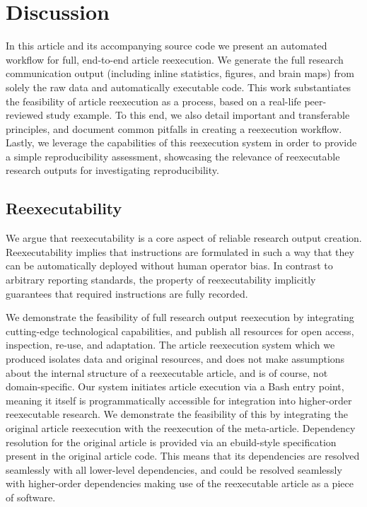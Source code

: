 \section{Discussion}

In this article and its accompanying source code \cite{me} we present an automated workflow for full, end-to-end article reexecution.
We generate the full research communication output (including inline statistics, figures, and brain maps) from solely the raw data and automatically executable code.
This work substantiates the feasibility of article reexecution as a process, based on a real-life peer-reviewed study example.
To this end, we also detail important and transferable principles, and document common pitfalls in creating a reexecution workflow.
Lastly, we leverage the capabilities of this reexecution system in order to provide a simple reproducibility assessment, showcasing the relevance of reexecutable research outputs for investigating reproducibility.

\subsection{Reexecutability}
We argue that reexecutability is a core aspect of reliable research output creation.
Reexecutability implies that instructions are formulated in such a way that they can be automatically deployed without human operator bias.
In contrast to arbitrary reporting standards, the property of reexecutability implicitly guarantees that required instructions are fully recorded.

We demonstrate the feasibility of full research output reexecution by integrating cutting-edge technological capabilities, and publish all resources for open access, inspection, re-use, and adaptation.
The article reexecution system which we produced isolates data and original resources, and does not make assumptions about the internal structure of a reexecutable article, and is of course, not domain-specific.
Our system initiates article execution via a Bash entry point, meaning it itself is programmatically accessible for integration into higher-order reexecutable research.
We demonstrate the feasibility of this by integrating the original article reexecution with the reexecution of the meta-article.
Dependency resolution for the original article is provided via an ebuild-style specification present in the original article code.
This means that its dependencies are resolved seamlessly with all lower-level dependencies, and could be resolved seamlessly with higher-order dependencies making use of the reexecutable article as a piece of software.

